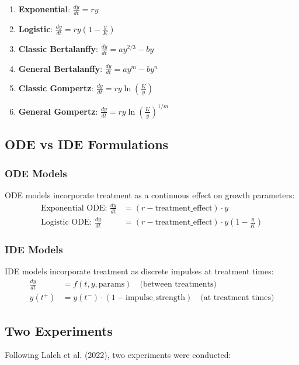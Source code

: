 \documentclass[11pt]{article}
\begin{document}
\begin{enumerate}
    \item \textbf{Exponential}: $\frac{dy}{dt} = ry$
    \item \textbf{Logistic}: $\frac{dy}{dt} = ry(1 - \frac{y}{K})$
    \item \textbf{Classic Bertalanffy}: $\frac{dy}{dt} = ay^{2/3} - by$
    \item \textbf{General Bertalanffy}: $\frac{dy}{dt} = ay^m - by^n$
    \item \textbf{Classic Gompertz}: $\frac{dy}{dt} = ry\ln(\frac{K}{y})$
    \item \textbf{General Gompertz}: $\frac{dy}{dt} = ry\ln(\frac{K}{y})^{1/m}$
\end{enumerate}

\subsection{ODE vs IDE Formulations}

\subsubsection{ODE Models}
ODE models incorporate treatment as a continuous effect on growth parameters:
\begin{align}
\text{Exponential ODE: } \frac{dy}{dt} &= (r - \text{treatment\_effect}) \cdot y \\
\text{Logistic ODE: } \frac{dy}{dt} &= (r - \text{treatment\_effect}) \cdot y(1 - \frac{y}{K})
\end{align}

\subsubsection{IDE Models}
IDE models incorporate treatment as discrete impulses at treatment times:
\begin{align}
\frac{dy}{dt} &= f(t, y, \text{params}) \quad \text{(between treatments)} \\
y(t^+) &= y(t^-) \cdot (1 - \text{impulse\_strength}) \quad \text{(at treatment times)}
\end{align}

\subsection{Two Experiments}

Following Laleh et al. (2022), two experiments were conducted:
\end{document}
